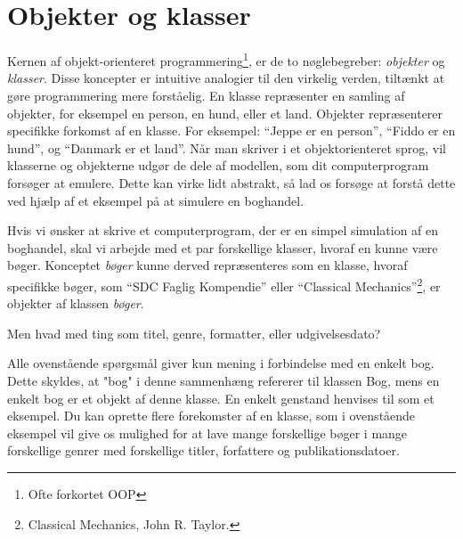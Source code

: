 
\newcommand\sillynote[1]{\footnote{#1}}

\chapter{Objekter og klasser}

Kernen af objekt-orienteret programmering\sillynote{Ofte forkortet OOP},
er de to nøglebegreber: \emph{objekter} og \emph{klasser}. Disse
koncepter er intuitive analogier til den virkelig verden, tiltænkt at
gøre programmering mere forståelig. En klasse repræsenter en samling
af objekter, for eksempel en person, en hund, eller et land. Objekter
repræsenterer specifikke forkomst af en klasse. For eksempel: ``Jeppe
er en person'', ``Fiddo er en hund'', og ``Danmark er et land''.
Når man skriver i et objektorienteret sprog, vil klasserne og
objekterne udgør de dele af modellen, som dit computerprogram forsøger
at emulere. Dette kan virke lidt abstrakt, så lad os forsøge at forstå
dette ved hjælp af et eksempel på at simulere en boghandel.

\begin{example}
    Hvis vi ønsker at skrive et computerprogram, der er en simpel
    simulation af en boghandel, skal vi arbejde med et par forskellige
    klasser, hvoraf en kunne være bøger. Konceptet \emph{bøger} kunne
    derved repræsenteres som en klasse, hvoraf specifikke bøger, som
    ``SDC Faglig Kompendie'' eller ``Classical
    Mechanics''\sillynote{Classical Mechanics, John R. Taylor.}, er
    objekter af klassen \emph{bøger}.

    Men hvad med ting som titel, genre, formatter, eller udgivelsesdato? 

    Alle ovenstående spørgsmål giver kun mening i forbindelse med en
    enkelt bog. Dette skyldes, at "bog" i denne sammenhæng refererer
    til klassen Bog, mens en enkelt bog er et objekt af denne klasse.
    En enkelt genstand henvises til som et eksempel. Du kan oprette
    flere forekomster af en klasse, som i ovenstående eksempel vil
    give os mulighed for at lave mange forskellige bøger i mange
    forskellige genrer med forskellige titler, forfattere og
    publikationsdatoer.
\end{example}

\begin{exercise}
\end{exercise}






